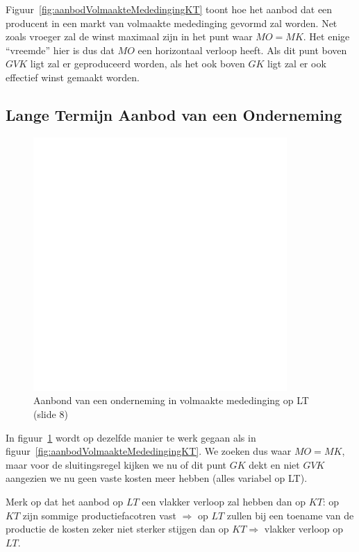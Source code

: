 Figuur~\ref{fig:aanbodVolmaakteMededingingKT} toont hoe het aanbod dat een producent in een markt van volmaakte mededinging gevormd zal worden. Net zoals vroeger zal de winst maximaal zijn in het punt waar $MO = MK$. Het enige ``vreemde'' hier is dus dat $MO$ een horizontaal verloop heeft. Als dit punt boven $GVK$ ligt zal er geproduceerd worden, als het ook boven $GK$ ligt zal er ook effectief winst gemaakt worden.

\subsection{Lange Termijn Aanbod van een Onderneming}
\begin{figure}[htbp]
   \centering
   \includegraphics[scale=0.4]{Images/white.png}
   \caption{Aanbond van een onderneming in volmaakte mededinging op LT (slide 8)}
   \label{fig:aanbodVolmaakteMededingingLT}
\end{figure}

In figuur~\ref{fig:aanbodVolmaakteMededingingLT} wordt op dezelfde manier te werk gegaan als in figuur~\ref{fig:aanbodVolmaakteMededingingKT}. We zoeken dus waar $MO = MK$, maar voor de sluitingsregel kijken we nu of dit punt $GK$ dekt en niet $GVK$ aangezien we nu geen vaste kosten meer hebben (alles variabel op LT).

Merk op dat het aanbod op $LT$ een vlakker verloop zal hebben dan op $KT$: op $KT$ zijn sommige productiefacotren vast $\Rightarrow$ op $LT$ zullen bij een toename van de productie de kosten zeker niet sterker stijgen dan op $KT \Rightarrow$ vlakker verloop op $LT$.


